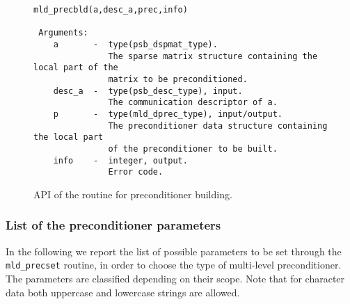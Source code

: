 %
\begin{figure}[h]
\begin{center}
{\small
\begin{verbatim} 
mld_precbld(a,desc_a,prec,info)

 Arguments:
    a       -  type(psb_dspmat_type).
               The sparse matrix structure containing the local part of the
               matrix to be preconditioned.
    desc_a  -  type(psb_desc_type), input.
               The communication descriptor of a.
    p       -  type(mld_dprec_type), input/output.
               The preconditioner data structure containing the local part
               of the preconditioner to be built.
    info    -  integer, output.
               Error code.              
\end{verbatim}
}
\end{center}
\caption{API of the routine for preconditioner building.\label{fig:prcbld}}
\end{figure}

\subsubsection{List of the preconditioner parameters\label{sec:list}}

In the following we report the list of possible parameters to be set through the \verb|mld_precset| routine,
in order to choose the type of multi-level preconditioner. The parameters are classified depending on their scope.
Note that for character data both uppercase and lowercase strings are allowed.


